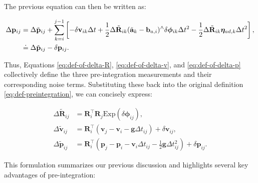The previous equation can then be written as:

\begin{equation}\label{eq:def-of-delta-p}
	\begin{aligned}
		\Delta \mathbf{p}_{ij} &= \Delta \tilde{\mathbf{p}}_{ij} + \sum_{k=i}^{j-1} \left[-\delta \mathbf{v}_{ik} \Delta t + 
		\frac{1}{2}\Delta \tilde{\mathbf{R}}_{ik} (\tilde{\mathbf{a}}_k - \mathbf{b}_{a,i})^\wedge \delta 
		\boldsymbol{\phi}_{ik} \Delta t^2 - \frac{1}{2} \Delta \tilde{\mathbf{R}}_{ik} \boldsymbol{\eta}_{ad, k} 
		\Delta t^2 \right], \\
		& \buildrel\textstyle.\over= \Delta\tilde{\mathbf{p}}_{ij} - \delta \mathbf{p}_{ij}.
	\end{aligned}
\end{equation}

Thus, Equations \eqref{eq:def-of-delta-R}, \eqref{eq:def-of-delta-v}, and \eqref{eq:def-of-delta-p} collectively define the three pre-integration measurements and their corresponding noise terms. Substituting these back into the original definition \eqref{eq:def-preintegration}, we can concisely express:

\begin{subequations}\label{key}
	\begin{align}
		\Delta \tilde{\mathbf{R}}_{ij} &= \mathbf{R}_i^\top \mathbf{R}_j \mathrm{Exp}(\delta 
		\boldsymbol{\phi}_{ij}), \\
		\Delta \tilde{\mathbf{v}}_{ij} &= \mathbf{R}_i^\top \left( \mathbf{v}_j - \mathbf{v}_i - \mathbf{g} \Delta t_{ij} \right) 
		+ \delta \mathbf{v}_{ij}, \\
		\Delta \tilde{\mathbf{p}}_{ij} &= \mathbf{R}_i^\top \left(\mathbf{p}_j - \mathbf{p}_i - \mathbf{v}_i \Delta t_{ij} - 
		\frac{1}{2}\mathbf{g} \Delta t_{ij}^2 \right) + \delta \mathbf{p}_{ij}.
	\end{align}
\end{subequations}

This formulation summarizes our previous discussion and highlights several key advantages of pre-integration:

